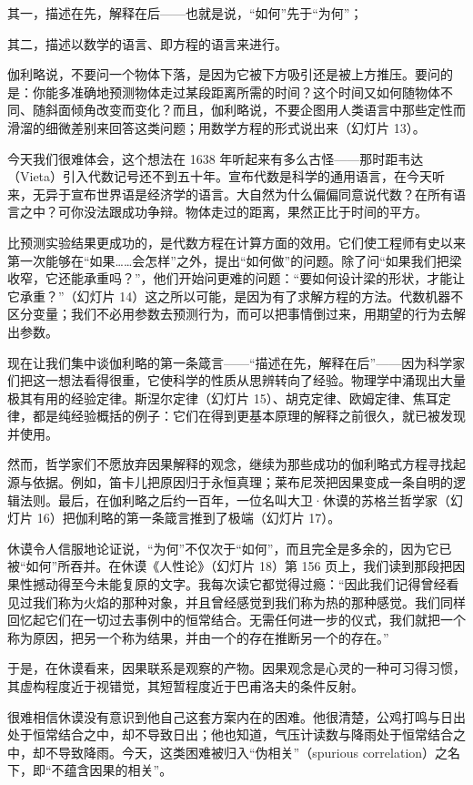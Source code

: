 其一，描述在先，解释在后——也就是说，“如何”先于“为何”；

其二，描述以数学的语言、即方程的语言来进行。

伽利略说，不要问一个物体下落，是因为它被下方吸引还是被上方推压。要问的是：你能多准确地预测物体走过某段距离所需的时间？这个时间又如何随物体不同、随斜面倾角改变而变化？而且，伽利略说，不要企图用人类语言中那些定性而滑溜的细微差别来回答这类问题；用数学方程的形式说出来（幻灯片 13）。

今天我们很难体会，这个想法在 1638 年听起来有多么古怪——那时距韦达（Vieta）引入代数记号还不到五十年。宣布代数是科学的通用语言，在今天听来，无异于宣布世界语是经济学的语言。大自然为什么偏偏同意说代数？在所有语言之中？可你没法跟成功争辩。物体走过的距离，果然正比于时间的平方。

比预测实验结果更成功的，是代数方程在计算方面的效用。它们使工程师有史以来第一次能够在“如果……会怎样”之外，提出“如何做”的问题。除了问“如果我们把梁收窄，它还能承重吗？”，他们开始问更难的问题：“要如何设计梁的形状，才能让它承重？”（幻灯片 14）这之所以可能，是因为有了求解方程的方法。代数机器不区分变量；我们不必用参数去预测行为，而可以把事情倒过来，用期望的行为去解出参数。

现在让我们集中谈伽利略的第一条箴言——“描述在先，解释在后”——因为科学家们把这一想法看得很重，它使科学的性质从思辨转向了经验。物理学中涌现出大量极其有用的经验定律。斯涅尔定律（幻灯片 15）、胡克定律、欧姆定律、焦耳定律，都是纯经验概括的例子：它们在得到更基本原理的解释之前很久，就已被发现并使用。

然而，哲学家们不愿放弃因果解释的观念，继续为那些成功的伽利略式方程寻找起源与依据。例如，笛卡儿把原因归于永恒真理；莱布尼茨把因果变成一条自明的逻辑法则。最后，在伽利略之后约一百年，一位名叫大卫·休谟的苏格兰哲学家（幻灯片 16）把伽利略的第一条箴言推到了极端（幻灯片 17）。

休谟令人信服地论证说，“为何”不仅次于“如何”，而且完全是多余的，因为它已被“如何”所吞并。在休谟《人性论》（幻灯片 18）第 156 页上，我们读到那段把因果性撼动得至今未能复原的文字。我每次读它都觉得过瘾：“因此我们记得曾经看见过我们称为火焰的那种对象，并且曾经感觉到我们称为热的那种感觉。我们同样回忆起它们在一切过去事例中的恒常结合。无需任何进一步的仪式，我们就把一个称为原因，把另一个称为结果，并由一个的存在推断另一个的存在。”

于是，在休谟看来，因果联系是观察的产物。因果观念是心灵的一种可习得习惯，其虚构程度近于视错觉，其短暂程度近于巴甫洛夫的条件反射。

很难相信休谟没有意识到他自己这套方案内在的困难。他很清楚，公鸡打鸣与日出处于恒常结合之中，却不导致日出；他也知道，气压计读数与降雨处于恒常结合之中，却不导致降雨。今天，这类困难被归入“伪相关”（spurious correlation）之名下，即“不蕴含因果的相关”。

